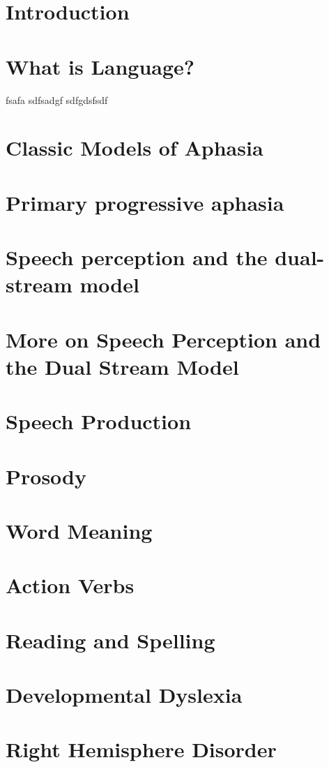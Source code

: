 \documentclass[]{article}
\author{}
\date{\vspace{-2.5em}}
\begin{document}
{
\setcounter{tocdepth}{2}
\tableofcontents
}
\section{Introduction}\label{introduction}

\section{What is Language?}\label{what-is-language}

fsafa sdfsadgf sdfgdsfsdf

\section{Classic Models of Aphasia}\label{classic-models-of-aphasia}

\section{Primary progressive aphasia}\label{primary-progressive-aphasia}

\section{Speech perception and the dual-stream
model}\label{speech-perception-and-the-dual-stream-model}

\section{More on Speech Perception and the Dual Stream
Model}\label{more-on-speech-perception-and-the-dual-stream-model}

\section{Speech Production}\label{speech-production}

\section{Prosody}\label{prosody}

\section{Word Meaning}\label{word-meaning}

\section{Action Verbs}\label{action-verbs}

\section{Reading and Spelling}\label{reading-and-spelling}

\section{Developmental Dyslexia}\label{developmental-dyslexia}

\section{Right Hemisphere Disorder}\label{right-hemisphere-disorder}
\end{document}
